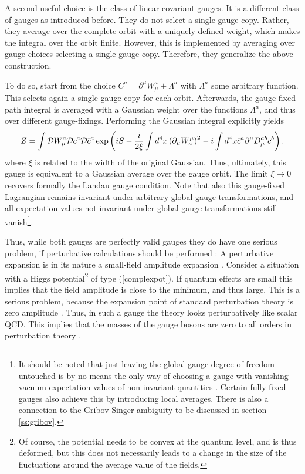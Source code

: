 \documentclass[final,twoside,12pt]{article}
\newcommand*{\no}{\noindent}
\newcommand*{\be}{\begin{equation}}
\newcommand*{\ee}{\end{equation}}
\newcommand*{\pd}{\partial}
\newcommand*{\pdm}{\pd_{\mu}}
\newcommand*{\pref}[1]{(\ref{#1})}
\newcommand*{\nn}{\nonumber}
\newcommand*{\1}{1\!\!\!\bot}
\begin{document}
A second useful choice is the class of linear covariant gauges. It is a different class of gauges as introduced before. They do not select a single gauge copy. Rather, they average over the complete orbit with a uniquely defined weight, which makes the integral over the orbit finite. However, this is implemented by averaging over gauge choices selecting a single gauge copy. Therefore, they generalize the above construction.

To do so, start from the choice $C^a=\pd^\mu W_\mu^a+\Lambda^a$ with $\Lambda^a$ some arbitrary function. This selects again a single gauge copy for each orbit. Afterwards, the gauge-fixed path integral is averaged with a Gaussian weight over the functions $\Lambda^a$, and thus over different gauge-fixings. Performing the Gaussian integral explicitly yields \cite{Bohm:2001yx}
\be
Z=\int{\cal D}W_\mu^a{\cal D}c^a{\cal D}{\bar c}^a\exp\left(iS-\frac{i}{2\xi}\int d^4 x\left(\pdm W^\mu_a\right)^2-i\int d^4x \bar{c}^a\pd^\mu D_\mu^{ab} c^b\right)\nn.
\ee
\no where $\xi$ is related to the width of the original Gaussian. Thus, ultimately, this gauge is equivalent to a Gaussian average over the gauge orbit. The limit $\xi\to 0$ recovers formally the Landau gauge condition. Note that also this gauge-fixed Lagrangian remains invariant under arbitrary global gauge transformations, and all expectation values not invariant under global gauge transformations still vanish\footnote{It should be noted that just leaving the global gauge degree of freedom untouched is by no means the only way of choosing a gauge with vanishing vacuum expectation values of non-invariant quantities \cite{Strocchi:1985cf}. Certain fully fixed gauges also achieve this by introducing local averages. There is also a connection to the Gribov-Singer ambiguity to be discussed in section \ref{ss:gribov}.}.

Thus, while both gauges are perfectly valid gauges they do have one serious problem, if perturbative calculations should be performed \cite{Lee:1974zg}: A perturbative expansion is in its nature a small-field amplitude expansion \cite{Rivers:1987hi}. Consider a situation with a Higgs potential\footnote{Of course, the potential needs to be convex at the quantum level, and is thus deformed, but this does not necessarily leads to a change in the size of the fluctuations around the average value of the fields.} of type \pref{complexpot}. If quantum effects are small this implies that the field amplitude is close to the minimum, and thus large. This is a serious problem, because the expansion point of standard perturbation theory is zero amplitude \cite{Bohm:2001yx}. Thus, in such a gauge the theory looks perturbatively like scalar QCD. This implies that the masses of the gauge bosons are zero to all orders in perturbation theory \cite{Bohm:2001yx}.
\end{document}
